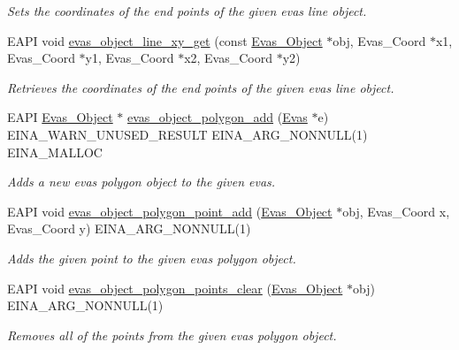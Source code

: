 \begin{DoxyCompactItemize}
\begin{DoxyCompactList}\small\item\em Sets the coordinates of the end points of the given evas line object. \item\end{DoxyCompactList}\item 
EAPI void \hyperlink{group__Evas__Line__Group_ga3fa674863aa41d655caa103f546a9092}{evas\_\-object\_\-line\_\-xy\_\-get} (const \hyperlink{group__Evas__Object__Group_ga9e19e6dd1f517a0ba437c0114d3e7c97}{Evas\_\-Object} $\ast$obj, Evas\_\-Coord $\ast$x1, Evas\_\-Coord $\ast$y1, Evas\_\-Coord $\ast$x2, Evas\_\-Coord $\ast$y2)
\begin{DoxyCompactList}\small\item\em Retrieves the coordinates of the end points of the given evas line object. \item\end{DoxyCompactList}\item 
EAPI \hyperlink{group__Evas__Object__Group_ga9e19e6dd1f517a0ba437c0114d3e7c97}{Evas\_\-Object} $\ast$ \hyperlink{group__Evas__Object__Polygon_gab6beb5b98de57a0f47707cac90f96bc9}{evas\_\-object\_\-polygon\_\-add} (\hyperlink{group__Evas__Canvas_ga5ff87cc4ce6bc43e3b640a6d37f73043}{Evas} $\ast$e) EINA\_\-WARN\_\-UNUSED\_\-RESULT EINA\_\-ARG\_\-NONNULL(1) EINA\_\-MALLOC
\begin{DoxyCompactList}\small\item\em Adds a new evas polygon object to the given evas. \item\end{DoxyCompactList}\item 
EAPI void \hyperlink{group__Evas__Object__Polygon_ga92cb2d99c88404307e30eed74688da76}{evas\_\-object\_\-polygon\_\-point\_\-add} (\hyperlink{group__Evas__Object__Group_ga9e19e6dd1f517a0ba437c0114d3e7c97}{Evas\_\-Object} $\ast$obj, Evas\_\-Coord x, Evas\_\-Coord y) EINA\_\-ARG\_\-NONNULL(1)
\begin{DoxyCompactList}\small\item\em Adds the given point to the given evas polygon object. \item\end{DoxyCompactList}\item 
EAPI void \hyperlink{group__Evas__Object__Polygon_ga6d559daf3a5eea36a275aaf3c76c8be2}{evas\_\-object\_\-polygon\_\-points\_\-clear} (\hyperlink{group__Evas__Object__Group_ga9e19e6dd1f517a0ba437c0114d3e7c97}{Evas\_\-Object} $\ast$obj) EINA\_\-ARG\_\-NONNULL(1)
\begin{DoxyCompactList}\small\item\em Removes all of the points from the given evas polygon object. \item\end{DoxyCompactList}\item 

\end{DoxyCompactItemize}
